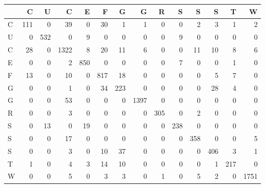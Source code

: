 \begin{tabular}{lrrrrrrrrrrrrr}
\toprule
{} &    C &    U &     C &    E &    F &    G &     G &    R &    S &    S &    S &    T &     W \\
\midrule
C &  111 &    0 &    39 &    0 &   30 &    1 &     1 &    0 &    0 &    2 &    3 &    1 &     2 \\
U &    0 &  532 &     0 &    9 &    0 &    0 &     0 &    0 &    9 &    0 &    0 &    0 &     0 \\
C &   28 &    0 &  1322 &    8 &   20 &   11 &     6 &    0 &    0 &   11 &   10 &    8 &     6 \\
E &    0 &    0 &     2 &  850 &    0 &    0 &     0 &    0 &    7 &    0 &    0 &    1 &     0 \\
F &   13 &    0 &    10 &    0 &  817 &   18 &     0 &    0 &    0 &    0 &    5 &    7 &     0 \\
G &    0 &    0 &     1 &    0 &   34 &  223 &     0 &    0 &    0 &    0 &   28 &    4 &     0 \\
G &    0 &    0 &    53 &    0 &    0 &    0 &  1397 &    0 &    0 &    0 &    0 &    0 &     0 \\
R &    0 &    0 &     3 &    0 &    0 &    0 &     0 &  305 &    0 &    2 &    0 &    0 &     0 \\
S &    0 &   13 &     0 &   19 &    0 &    0 &     0 &    0 &  238 &    0 &    0 &    0 &     0 \\
S &    0 &    0 &    17 &    0 &    0 &    0 &     0 &    0 &    0 &  358 &    0 &    0 &     5 \\
S &    0 &    0 &     3 &    0 &   10 &   37 &     0 &    0 &    0 &    0 &  406 &    3 &     1 \\
T &    1 &    0 &     4 &    3 &   14 &   10 &     0 &    0 &    0 &    0 &    1 &  217 &     0 \\
W &    0 &    0 &     5 &    0 &    3 &    3 &     0 &    1 &    0 &    5 &    2 &    0 &  1751 \\
\bottomrule
\end{tabular}
